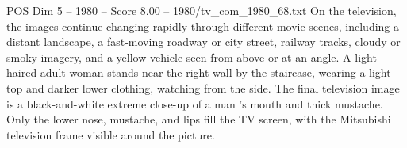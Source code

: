 \begin{textsample}{POS Dim 5 – 1980 – Score 8.00 – 1980/tv\_com\_1980\_68.txt}
On the television, the images continue changing rapidly through different movie scenes, including a distant landscape, a fast-moving roadway or city street, railway tracks, cloudy or smoky imagery, and a yellow vehicle seen from above or at an angle.
A light-haired adult woman stands near the right wall by the staircase, wearing a light top and darker lower clothing, watching from the side.
The final television image is a black-and-white extreme close-up of a man ’s mouth and thick mustache.
Only the lower nose, mustache, and lips fill the TV screen, with the Mitsubishi television frame visible around the picture.

\end{textsample}
